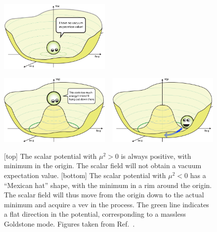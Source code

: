 \begin{figure}[htb]
  \centering
  \includegraphics[width=0.48\textwidth]{figures/standardmodel/BoringPotential}
  
  \vspace{2eM}
  
  \includegraphics[width=0.48\textwidth]{figures/standardmodel/Higgs-Potential-lookdown}
  ~
  \includegraphics[width=0.48\textwidth]{figures/standardmodel/Higgs-Potential-Goldstone}
  \caption{ [top] The scalar potential with $\mu^2 > 0$ is always positive, with minimum in the
origin. The scalar field will not obtain a vacuum expectation value. 
  [bottom] The scalar potential with $\mu^2 < 0$ has a ``Mexican hat'' shape, with the minimum in a
rim around the origin. The scalar field will thus move from the origin down to the actual minimum
and acquire a vev in the process. The green line indicates a flat direction in the potential,
corresponding to a massless Goldstone mode.
  Figures taken from Ref.~\cite{Higgs_potential}.
  \label{fig:Higgs_potential}}
\end{figure}

